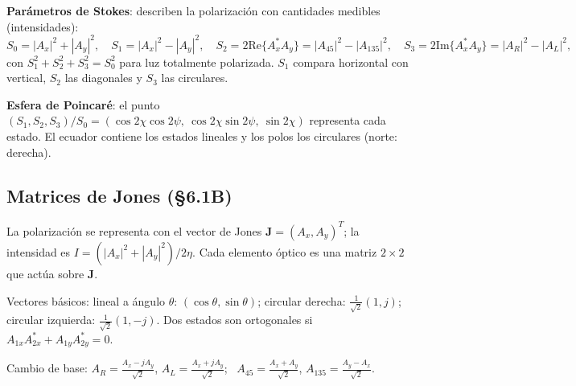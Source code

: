 \documentclass[10pt]{article}
\newcommand{\J}{\mathbf J}
\begin{document}
\textbf{Parámetros de Stokes}: describen la polarización con cantidades medibles (intensidades):
\[
S_0=|A_x|^2+|A_y|^2,\quad S_1=|A_x|^2-|A_y|^2,\quad S_2=2\mathrm{Re}\{A_x^*A_y\}=|A_{45}|^2-|A_{135}|^2,\quad S_3=2\mathrm{Im}\{A_x^*A_y\}=|A_R|^2-|A_L|^2,
\]
con $S_1^2+S_2^2+S_3^2=S_0^2$ para luz totalmente polarizada. $S_1$ compara horizontal con vertical, $S_2$ las diagonales y $S_3$ las circulares.

\textbf{Esfera de Poincaré}: el punto $(S_1,S_2,S_3)/S_0=(\cos2\chi\cos2\psi,\ \cos2\chi\sin2\psi,\ \sin2\chi)$ representa cada estado. El ecuador contiene los estados lineales y los polos los circulares (norte: derecha).

\subsection{Matrices de Jones (§6.1B)}
La polarización se representa con el vector de Jones $\J=(A_x,A_y)^T$; la intensidad es $I=(|A_x|^2+|A_y|^2)/2\eta$. Cada elemento óptico es una matriz $2\times2$ que actúa sobre $\J$.

Vectores básicos: lineal a ángulo $\theta$: $(\cos\theta,\sin\theta)$; circular derecha: $\frac1{\sqrt2}(1,j)$; circular izquierda: $\frac1{\sqrt2}(1,-j)$. Dos estados son ortogonales si $A_{1x}A_{2x}^*+A_{1y}A_{2y}^*=0$.

Cambio de base: $A_R=\frac{A_x-jA_y}{\sqrt2}$, $A_L=\frac{A_x+jA_y}{\sqrt2}$; \ $A_{45}=\frac{A_x+A_y}{\sqrt2}$, $A_{135}=\frac{A_y-A_x}{\sqrt2}$.
\end{document}
